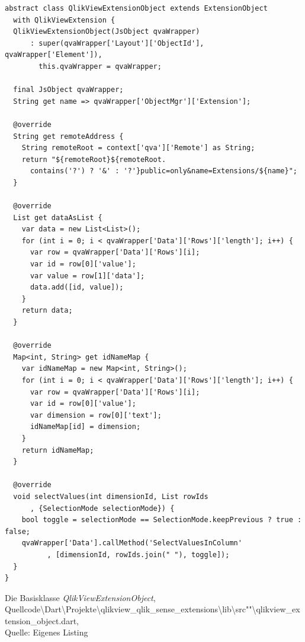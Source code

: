 \begin{listing}[htbp]
\begin{verbatim}
abstract class QlikViewExtensionObject extends ExtensionObject
  with QlikViewExtension {
  QlikViewExtensionObject(JsObject qvaWrapper)
      : super(qvaWrapper['Layout']['ObjectId'], qvaWrapper['Element']),
        this.qvaWrapper = qvaWrapper;

  final JsObject qvaWrapper;
  String get name => qvaWrapper['ObjectMgr']['Extension'];

  @override
  String get remoteAddress {
    String remoteRoot = context['qva']['Remote'] as String;
    return "${remoteRoot}${remoteRoot.
      contains('?') ? '&' : '?'}public=only&name=Extensions/${name}";
  }

  @override
  List get dataAsList {
    var data = new List<List>();
    for (int i = 0; i < qvaWrapper['Data']['Rows']['length']; i++) {
      var row = qvaWrapper['Data']['Rows'][i];
      var id = row[0]['value'];
      var value = row[1]['data'];
      data.add([id, value]);
    }
    return data;
  }

  @override
  Map<int, String> get idNameMap {
    var idNameMap = new Map<int, String>();
    for (int i = 0; i < qvaWrapper['Data']['Rows']['length']; i++) {
      var row = qvaWrapper['Data']['Rows'][i];
      var id = row[0]['value'];
      var dimension = row[0]['text'];
      idNameMap[id] = dimension;
    }
    return idNameMap;
  }

  @override
  void selectValues(int dimensionId, List rowIds
	  , {SelectionMode selectionMode}) {
    bool toggle = selectionMode == SelectionMode.keepPrevious ? true : false;
    qvaWrapper['Data'].callMethod('SelectValuesInColumn'
		  , [dimensionId, rowIds.join(" "), toggle]);
  }
}
\end{verbatim}
\caption[Die Basisklasse \textit{QlikViewExtensionObject}]{Die Basisklasse \textit{QlikViewExtensionObject}, \\Quellcode\textbackslash{}Dart\textbackslash{}Projekte\textbackslash{}qlikview\_qlik\_sense\_extensions\textbackslash{}lib\textbackslash{}src""\textbackslash{}qlikview\_extension\_object.dart, \\Quelle: Eigenes Listing}
\label{lst:BasisklasseQlikViewExtensionObject}
\end{listing}

